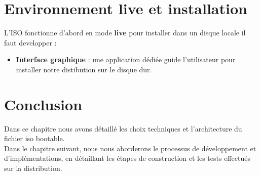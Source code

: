 \section{Environnement live et installation}  
L’ISO fonctionne d’abord en mode \textbf{live} pour installer dans un disque locale il faut developper :  
\begin{itemize}  
  \item \textbf{Interface graphique} :  une application dédiée guide l’utilisateur pour installer notre distibution sur le disque dur.  
  
   
\end{itemize}  




\section{Conclusion}
Dans ce chapitre nous avons détaillé les choix techniques et l'architecture du fichier iso bootable.\\
Dans le chapitre suivant, nous nous aborderons le processus de développement et d'implémentations, en détaillant les étapes de construction et les tests effectués sur la distribution.